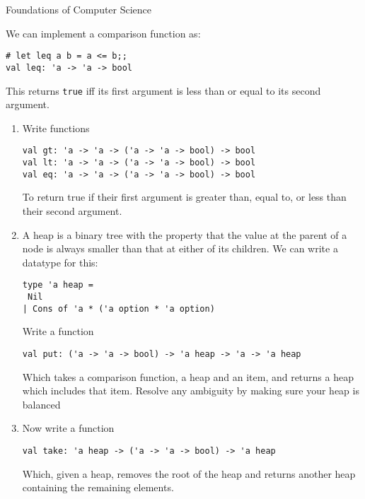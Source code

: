 \documentclass{tripos}  %
\begin{document}
\begin{question}[MockIA,year=2024,paper=1,question=4,author=rrw]{Foundations of Computer Science}


  We can implement a comparison function as:

\begin{verbatim}
# let leq a b = a <= b;;
val leq: 'a -> 'a -> bool
\end{verbatim}

This returns \verb|true| iff its first argument is less than or equal to its second argument.

\begin{enumerate}
\item Write functions

\begin{verbatim}
val gt: 'a -> 'a -> ('a -> 'a -> bool) -> bool
val lt: 'a -> 'a -> ('a -> 'a -> bool) -> bool
val eq: 'a -> 'a -> ('a -> 'a -> bool) -> bool
\end{verbatim}

To return true if their first argument is greater than, equal to, or less than their second argument.

\item A heap is a binary tree with the property that the value at the parent of a node is always smaller than that at either of its children.
  We can write a datatype for this:

\begin{verbatim}
type 'a heap =
 Nil
| Cons of 'a * ('a option * 'a option)
\end{verbatim}

Write a function

\begin{verbatim}
val put: ('a -> 'a -> bool) -> 'a heap -> 'a -> 'a heap
\end{verbatim}

Which takes a comparison function, a heap and an item, and returns a heap which includes that item. Resolve any ambiguity by making sure your heap is balanced

\item Now write a function

\begin{verbatim}
val take: 'a heap -> ('a -> 'a -> bool) -> 'a heap
\end{verbatim}

Which, given a heap, removes the root of the heap and returns another heap containing the remaining elements.


\end{enumerate}
\end{question}
\end{document}
